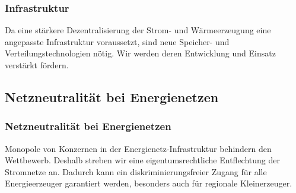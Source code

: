 \subsubsection{Infrastruktur}
\abstimmung
Da eine stärkere Dezentralisierung der Strom- und Wärmeerzeugung eine angepasste Infrastruktur voraussetzt, sind neue Speicher- und Verteilungstechnologien nötig. Wir werden deren Entwicklung und Einsatz verstärkt fördern.
 
\subsection*{Netzneutralität bei Energienetzen}

\subsubsection{Netzneutralität bei Energienetzen}
\abstimmung
Monopole von Konzernen in der Energienetz-Infrastruktur behindern den Wettbewerb. Deshalb streben wir eine eigentumsrechtliche Entflechtung der Stromnetze an. Dadurch kann ein diskriminierungsfreier Zugang für alle Energieerzeuger garantiert werden, besonders auch für regionale Kleinerzeuger.
